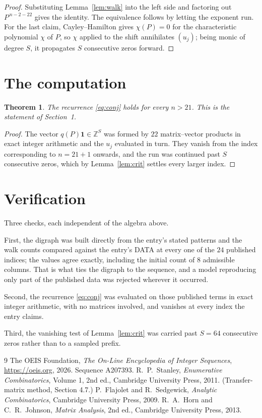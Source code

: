 \documentclass[11pt,a4paper]{article}
\theoremstyle{plain}
\newtheorem{theorem}{Theorem}
\theoremstyle{definition}
\begin{document}
\begin{proof}
Substituting Lemma~\ref{lem:walk} into the left side and factoring out
$P^{\,n-2-22}$ gives the identity. The equivalence follows by letting the exponent
run. For the last claim, Cayley--Hamilton gives $\chi(P)=0$ for the characteristic
polynomial $\chi$ of $P$, so $\chi$ applied to the shift annihilates $(u_j)$; being monic of
degree $S$, it propagates $S$ consecutive zeros forward.
\end{proof}

\section{The computation}

\begin{theorem}
The recurrence \eqref{eq:conj} holds for every $n>21$. This is the statement of
Section~1.
\end{theorem}

\begin{proof}
The vector $q(P)\mathbf{1}\in\mathbb{Z}^{S}$ was formed by $22$ matrix--vector
products in exact integer arithmetic and the $u_j$ evaluated in turn. They vanish from the
index corresponding to $n=21+1$ onwards, and the run was continued past $S$ consecutive
zeros, which by Lemma~\ref{lem:crit} settles every larger index.
\end{proof}

\section{Verification}

Three checks, each independent of the algebra above.

First, the digraph was built directly from the entry's stated patterns and the walk counts
compared against the entry's DATA at every one of the $24$ published indices; the
values agree exactly, including the initial count of $8$ admissible columns. That is
what ties the digraph to the sequence, and a model reproducing only part of the published
data was rejected wherever it occurred.

Second, the recurrence \eqref{eq:conj} was evaluated on those published terms in exact
integer arithmetic, with no matrices involved, and vanishes at every index the entry claims.

Third, the vanishing test of Lemma~\ref{lem:crit} was carried past $S=64$ consecutive
zeros rather than to a sampled prefix.

\begin{thebibliography}{9}
 The OEIS Foundation, \emph{The On-Line Encyclopedia of Integer
Sequences}, \url{https://oeis.org}, 2026. Sequence A207393.
 R.~P.~Stanley, \emph{Enumerative Combinatorics}, Volume 1, 2nd ed.,
Cambridge University Press, 2011. (Transfer-matrix method, Section 4.7.)
 P.~Flajolet and R.~Sedgewick, \emph{Analytic Combinatorics}, Cambridge
University Press, 2009.
 R.~A.~Horn and C.~R.~Johnson, \emph{Matrix Analysis}, 2nd ed., Cambridge
University Press, 2013.
\end{thebibliography}
\end{document}

